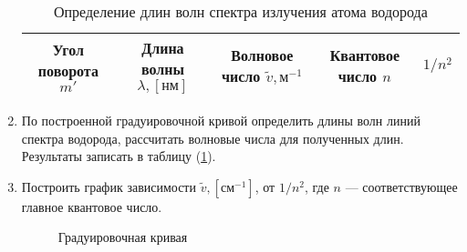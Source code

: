 \documentclass[12pt]{article}
\let\oldref\ref
\renewcommand{\ref}[1]{(\oldref{#1})}
\begin{document}
\begin{enumerate}[wide, labelwidth=!, labelindent=0pt]
\begin{table}[h!]
            \caption{Определение длин волн спектра излучения атома водорода}
            \label{tab:2}
            \centering
            \begin{tabular}{|c|c|c|c|c|}
                \hline
                Угол поворота $ m' $    & Длина волны $\lambda, [нм]$   & Волновое число $ \widetilde{v}, м^{-1} $  & Квантовое число $ n $     & $ 1/n^2 $\\
                \hline
            \end{tabular}
        \end{table}
        \item По  построенной  градуировочной  кривой  определить  длины  волн  линий  спектра водорода, рассчитать волновые числа для полученных длин. Результаты записать в таблицу \ref{tab:2}.
        \item Построить  график  зависимости $ \widetilde{v}, [см^{-1}] $, от $ 1/n^2 $,  где $ n $ --- соответствующее  главное квантовое число.
        \begin{figure}[h!]
            \label{graph:2}
            \caption{Градуировочная кривая}
            \centering
        \end{figure}


\end{enumerate}
\end{document}
